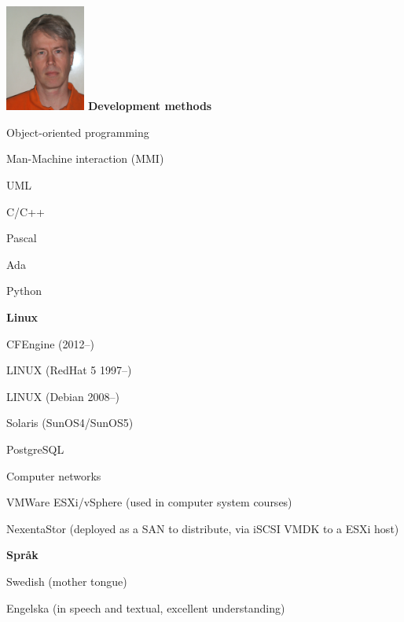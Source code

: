 \documentclass[a4paper,swedish,10pt]{article}
\begin{document}
\begin{minipage}[t]{0.24\textwidth}%
  \raggedleft%
  \vspace{-\topskip+1cm}
  \includegraphics[height=3.5cm]{idbild.jpg}
  \textbf{Development methods}
  \begin{description}[nosep]
    \raggedleft\setlength\itemsep{0.1ex}\small%
  \item Object-oriented programming
  \item Man-Machine interaction (MMI)
  \item UML
  \item C/C++
  \item Pascal
  \item Ada
  \item Python
  \end{description}
  \vspace{0.5cm}
  \textbf{Linux}
  \begin{description}[nosep,font=\sffamily\bfseries]
    \raggedleft\setlength\itemsep{0.1ex}\small%
  \item CFEngine (2012--)
  \item LINUX (RedHat 5 1997--)
  \item LINUX (Debian 2008--)
  \item Solaris (SunOS4/SunOS5)
  \item PostgreSQL
  \item Computer networks
  \item VMWare ESXi/vSphere (used in computer system courses)
  \item NexentaStor (deployed as a SAN to distribute, via iSCSI VMDK to a ESXi host)
  \end{description}
  \vspace{0.5cm}
  \textbf{Språk}
  \begin{description}[nosep,itemsep=0.1ex]
    \raggedleft\small%
  \item Swedish (mother tongue)
  \item Engelska (in speech and textual, excellent understanding)
  \end{description}
\end{minipage}
\end{document}
